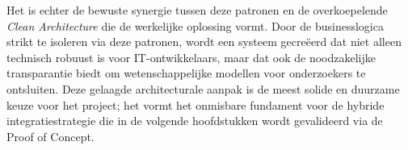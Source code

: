 Het is echter de bewuste synergie tussen deze patronen en de overkoepelende \textit{Clean Architecture} die de werkelijke oplossing vormt. Door de businesslogica strikt te isoleren via deze patronen, wordt een systeem gecreëerd dat niet alleen technisch robuust is voor IT-ontwikkelaars, maar dat ook de noodzakelijke transparantie biedt om wetenschappelijke modellen voor onderzoekers te ontsluiten. Deze gelaagde architecturale aanpak is de meest solide en duurzame keuze voor het project; het vormt het onmisbare fundament voor de hybride integratiestrategie die in de volgende hoofdstukken wordt gevalideerd via de Proof of Concept.
